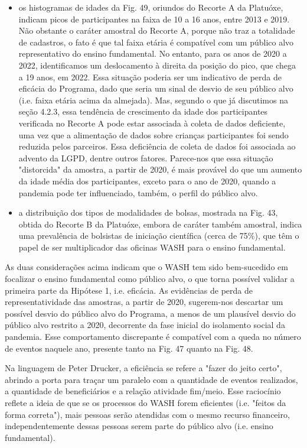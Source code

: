\begin{itemize}
\item os histogramas de idades da Fig. 49, oriundos do Recorte A da Platuóxe, indicam picos de participantes na faixa de 10 a 16 anos, entre  2013 e 2019. Não obstante o caráter amostral do Recorte A, porque não traz a totalidade de cadastros, o fato é que tal faixa etária é compatível com um público alvo representativo do ensino fundamental. No entanto, para os anos de 2020 a 2022, identificamos um deslocamento à direita da posição do pico, que chega a 19 anos, em 2022. Essa situação poderia ser um indicativo de perda de eficácia do Programa, dado que seria um sinal de desvio de seu público alvo (i.e. faixa etária acima da almejada). Mas, segundo o que já discutimos na seção 4.2.3, essa tendência de crescimento da idade dos participantes verificada no Recorte A pode estar associada à coleta de dados deficiente, uma vez que a alimentação de dados sobre crianças participantes foi sendo reduzida pelos parceiros. Essa deficiência de coleta de dados foi associada ao advento da LGPD, dentre outros fatores.  Parece-nos que essa situação "distorcida"  da amostra, a partir de 2020, é  mais provável do que um aumento da idade média dos participantes, exceto para o ano de 2020, quando a pandemia pode ter influenciado, também, o perfil do público alvo.
\item a distribuição dos tipos de modalidades de bolsas, mostrada na Fig. 43, obtida do Recorte B da Platuóxe, embora de caráter também amostral, indica uma prevalência de bolsistas de iniciação científica (cerca de 75\%), que têm o papel de ser  multiplicador das oficinas WASH para o ensino fundamental.
\end{itemize}

As duas considerações acima indicam que o WASH tem sido bem-sucedido em focalizar o ensino fundamental como público alvo, o que torna possível validar a primeira parte da Hipótese 1, i.e. eficácia. As evidências de perda de representatividade das amostras, a partir de 2020, sugerem-nos descartar um possível desvio do público alvo do Programa, a menos de um plausível desvio do público alvo restrito a 2020, decorrente da fase inicial do isolamento social da pandemia. Esse comportamento discrepante é compatível com a queda no número de eventos naquele ano, presente tanto na Fig. 47 quanto na Fig. 48.

Na linguagem de Peter Drucker, a eficiência se refere a "fazer do jeito certo", abrindo a porta para traçar um paralelo com a quantidade de eventos realizados, a quantidade de beneficiários e a relação atividade fim/meio. Esse raciocínio reflete a ideia de que se os processos do WASH forem eficientes (i.e. "feitos da forma correta"), mais pessoas serão atendidas com o mesmo recurso financeiro, independentemente dessas pessoas serem parte do público alvo (i.e. ensino fundamental).

